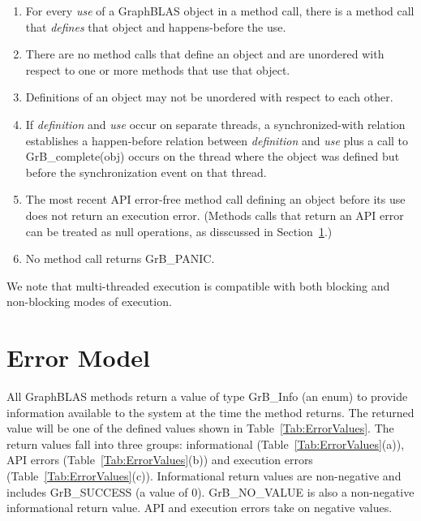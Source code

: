 \begin{enumerate}

	\item For every \emph{use} of a GraphBLAS object in a method call, there
	is a method call that \emph{defines} that object and happens-before
	the use.
	
	\item There are no method calls that define an object and are
	unordered with respect to one or more methods that use that
	object.

	\item Definitions of an object may not be unordered
	with respect to each other.	
	
	\item If \emph{definition} and \emph{use} occur on separate threads, 
	a synchronized-with relation establishes a happen-before relation
	between \emph{definition} and \emph{use} plus a call to
	{\sf GrB\_complete(obj)} occurs on the thread where the object was defined
      but before the synchronization event on that thread.    

	\item The most recent API error-free method call defining an object before
		its use does not return an execution error. (Methods calls
		that return an API error can be treated as null operations, as
		disscussed in Section~\ref{Sec:ErrorModel}.)

	\item No method call returns {\sf GrB\_PANIC}.

\end{enumerate}

We note that multi-threaded execution is compatible with both blocking and non-blocking
modes of execution. 


\section{Error Model}
\label{Sec:ErrorModel}

All GraphBLAS methods return a value of type {\sf GrB\_Info} (an enum) to provide
information available to the system at the time the method returns. The
returned value will be one of the defined values shown in 
Table~\ref{Tab:ErrorValues}. The return values fall into three groups: 
informational (Table~\ref{Tab:ErrorValues}(a)), API errors 
(Table~\ref{Tab:ErrorValues}(b)) and execution errors 
(Table~\ref{Tab:ErrorValues}(c)).  Informational return values are 
non-negative and includes {\sf GrB\_SUCCESS} (a value of 0).  {\sf GrB\_NO\_VALUE} 
is also a non-negative informational return value.  API and execution errors
take on negative values.

